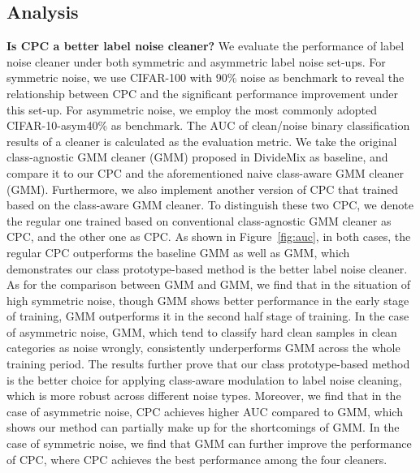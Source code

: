 \documentclass{article} \usepackage{iclr2023_conference,times}
\begin{document}
\subsection{Analysis}
\textbf{Is CPC a better label noise cleaner?} We evaluate the performance of label noise cleaner under both symmetric and asymmetric label noise set-ups. For symmetric noise, we use CIFAR-100 with 90\% noise as benchmark to reveal the relationship between CPC and the significant performance improvement under this set-up. For asymmetric noise, we employ the most commonly adopted CIFAR-10-asym40\% as benchmark. The AUC of clean/noise binary classification results of a cleaner is calculated as the evaluation metric. We take the original class-agnostic GMM cleaner (GMM) proposed in DivideMix as baseline, and compare it to our CPC and the aforementioned naive class-aware GMM cleaner (GMM). Furthermore, we also implement another version of CPC that trained based on the class-aware GMM cleaner. To distinguish these two CPC, we denote the regular one trained based on conventional class-agnostic GMM cleaner as CPC, and the other one as CPC. As shown in Figure~\ref{fig:auc}, in both cases, the regular CPC outperforms the baseline GMM as well as GMM, which demonstrates our class prototype-based method is the better label noise cleaner. As for the comparison between GMM and GMM, we find that in the situation of high symmetric noise, though GMM shows better performance in the early stage of training, GMM outperforms it in the second half stage of training. In the case of asymmetric noise, GMM, which tend to classify hard clean samples in clean categories as noise wrongly, consistently underperforms GMM across the whole training period. The results further prove that our class prototype-based method is the better choice for applying class-aware modulation to label noise cleaning, which is more robust across different noise types. Moreover, we find that in the case of asymmetric noise, CPC achieves higher AUC compared to GMM, which shows our method can partially make up for the shortcomings of GMM. In the case of symmetric noise, we find that GMM can further improve the performance of CPC, where CPC achieves the best performance among the four cleaners.
\end{document}
